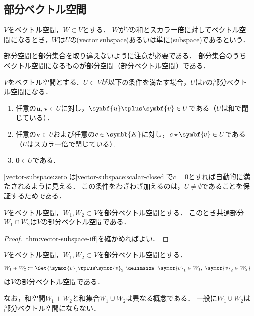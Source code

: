 \documentclass[../sotsu.tex]{subfiles}
\begin{document}
\subsection{部分ベクトル空間}

\begin{definition}[部分ベクトル空間]
    \label{dfn:vector-subspace}
    $V$をベクトル空間，$W \subset V$とする．
    $W$が$V$の和とスカラー倍に対してベクトル空間になるとき，$W$は$U$の(vector subspace)あるいは単に(subspace)であるという．
\end{definition}

部分空間と部分集合を取り違えないように注意が必要である．
部分集合のうちベクトル空間になるものが部分空間（部分ベクトル空間）である．

\begin{theorem}
    \label{thm:vector-subspace-iff}
    $V$をベクトル空間とする．$U \subset V$が以下の条件を満たす場合，$U$は$V$の部分ベクトル空間になる．
    \begin{enumerate}
        \item \label{vector-subspace:sum-closed} 任意の$\symbf{u}, \symbf{v} \in U$に対し，$\symbf{u} \vecplus \symbf{v} \in U$である（$U$は和で閉じている）．
        \item \label{vector-subspace:scalar-closed} 任意の$\symbf{v} \in U$および任意の$c \in \symbb{K}$に対し，$c \scaprod \symbf{v} \in U$である（$U$はスカラー倍で閉じている）．
        \item \label{vector-subspace:zero} $\symbf{0} \in U$である．
    \end{enumerate}
    \cref{vector-subspace:zero}は\cref{vector-subspace:scalar-closed}で$c=0$とすれば自動的に満たされるように見える．
    この条件をわざわざ加えるのは，$U \neq \emptyset$であることを保証するためである．
\end{theorem}


\begin{proposition}
    \label{thm:intersection-of-vector-space}
    $V$をベクトル空間，$W_1, W_2 \subset V$を部分ベクトル空間とする．
    このとき共通部分$W_1 \cap W_2$は$V$の部分ベクトル空間である．
\end{proposition}

\begin{proof}
    \cref{thm:vector-subspace-iff}を確かめればよい．
\end{proof}


\begin{definition}[和空間]
    \label{dfn:sum-of-vector-space}
    $V$をベクトル空間，$W_1, W_2 \subset V$を部分ベクトル空間とする．
    \begin{equation}
        W_1 + W_2 \coloneq \Set{  \symbf{v}_1 \vecplus \symbf{v}_2  \given  \symbf{v}_1 \in W_1, \  \symbf{v}_2 \in W_2  }
    \end{equation}
    は$V$の部分ベクトル空間である．
\end{definition}
なお，和空間$W_1 + W_2$と和集合$W_1 \cup W_2$は異なる概念である．
一般に$W_1 \cup W_2$は部分ベクトル空間にならない．
\end{document}
